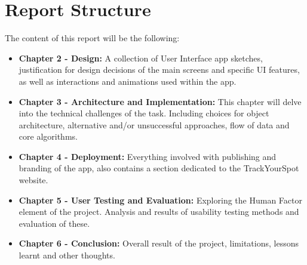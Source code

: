 \section{Report Structure}
The content of this report will be the following:
\begin{itemize}
    \item \textbf{Chapter 2 - Design: }A collection of User Interface app sketches, justification for design decisions of the main screens and specific UI features, as well as interactions and animations used within the app.
    \item \textbf{Chapter 3 - Architecture and Implementation: }This chapter will delve into the technical challenges of the task. Including choices for object architecture, alternative and/or unsuccessful approaches, flow of data and core algorithms.
    \item \textbf{Chapter 4 - Deployment: }Everything involved with publishing and branding of the app, also contains a section dedicated to the TrackYourSpot website.
    \item \textbf{Chapter 5 - User Testing and Evaluation: } Exploring the Human Factor element of the project. Analysis and results of usability testing methods and evaluation of these.
    \item \textbf{Chapter 6 - Conclusion: }Overall result of the project, limitations, lessons learnt and other thoughts.
\end{itemize}